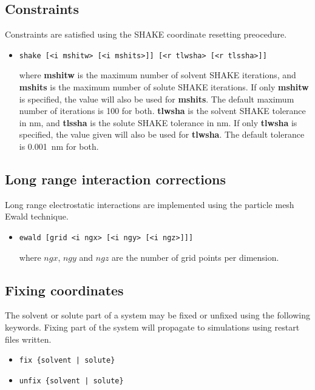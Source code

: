\subsection{Constraints}
Constraints are satisfied using the SHAKE coordinate resetting preocedure.
\begin{itemize}
\item
\begin{verbatim}
shake [<i mshitw> [<i mshits>]] [<r tlwsha> [<r tlssha>]]
\end{verbatim}
where {\bf mshitw} is the maximum number of solvent SHAKE iterations,
and {\bf mshits} is the maximum number of solute SHAKE iterations. If
only {\bf mshitw} is specified, the value will also be used for {\bf mshits}.
The default maximum number of iterations is 100 for both.
{\bf tlwsha} is the solvent SHAKE tolerance in nm, and {\bf tlssha} is
the solute SHAKE tolerance in nm. If only {\bf tlwsha} is specified, the
value given will also be used for {\bf tlwsha}. The default tolerance
is 0.001~nm for both.
\end{itemize}
\subsection{Long range interaction corrections}
Long range electrostatic interactions are implemented using the
particle mesh Ewald technique.
\begin{itemize}
\item
\begin{verbatim}
ewald [grid <i ngx> [<i ngy> [<i ngz>]]]
\end{verbatim}
where $ngx$, $ngy$ and $ngz$ are the number of grid points per dimension.
\end{itemize}
\subsection{Fixing coordinates}
The solvent or solute part of a system may be fixed or unfixed using
the following keywords. Fixing part of the system will propagate to
simulations using restart files written.
\begin{itemize}
\item
\begin{verbatim}
fix {solvent | solute}
\end{verbatim}
\item
\begin{verbatim}
unfix {solvent | solute}
\end{verbatim}
\end{itemize}

